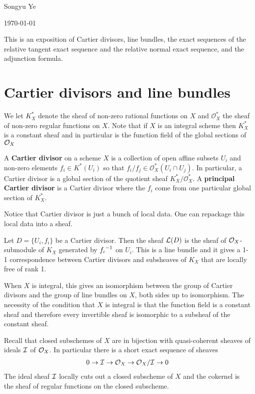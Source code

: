 \documentclass[12pt]{article}
\begin{document}
Songyu Ye

\today

\hfill

This is an exposition of Cartier divisors, line bundles, 
the exact sequences of the relative tangent exact sequence and the relative normal exact sequence, and the adjunction formula.

\section{Cartier divisors and line bundles}
We let $K_X^*$ denote the sheaf of non-zero rational functions on $X$ and $\mathcal{O}_X^*$ the sheaf of non-zero regular functions on $X$.
Note that if $X$ is an integral scheme then $K_X^*$ is a constant sheaf and in particular is the function field of the global sections of ${\mathcal{O}}_X$
\begin{definition}
    A \textbf{Cartier divisor} on a scheme $X$ is a collection of open affine subsets $U_i$ and non-zero elements $f_i\in K^*(U_i)$ 
    so that $f_i/f_j\in \mathcal{O}_X^*(U_i\cap U_j)$. In particular, a Cartier divisor is a global section of the quotient sheaf
    $K_X^*/\mathcal{O}_X^*$. A \textbf{principal Cartier divisor} is a Cartier divisor where the $f_i$ come from one particular global section of $K_X^*$.
\end{definition}

Notice that Cartier divisor is just a bunch of local data. One can repackage this local data into a sheaf. 
\begin{definition}
    Let $D = \{U_i,f_i\}$ be a Cartier divisor. Then the sheaf ${\mathcal{L}}(D)$ is the sheaf of ${\mathcal{O}}_X$-submodule of $K_X$ generated by ${f_i}^{-1}$ on $U_i$.
    This is a line bundle and it gives a 1-1 correspondence between Cartier divisors and subsheaves of $K_X$ that are locally free of rank 1.
\end{definition}

When $X$ is integral, this gives an isomorphism between the group of Cartier divisors and the group of line bundles on $X$, both sides up to isomorphism. The necessity of the condition that $X$ is integral is that the function field is a constant sheaf and therefore every invertible sheaf is isomorphic to a subsheaf of the constant sheaf.

\hfill

Recall that closed subschemes of $X$ are in bijection with quasi-coherent sheaves of ideals ${\mathcal{I}}$ of ${\mathcal{O}}_X$. In particular there is a 
short exact sequence of sheaves \begin{align*}
    0\to {\mathcal{I}}\to {\mathcal{O}}_X\to {\mathcal{O}}_X/{\mathcal{I}}\to 0
\end{align*} The ideal sheaf ${\mathcal{I}}$ locally cuts out a closed subscheme of $X$ and the cokernel is the sheaf of regular functions on the
closed subscheme. 
\end{document}
